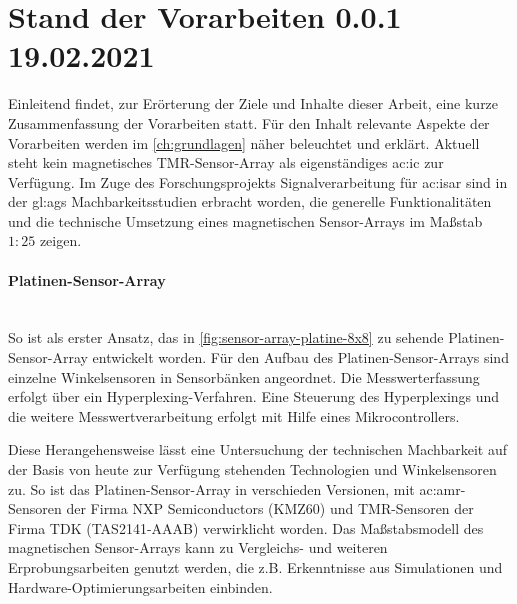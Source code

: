 %

\section{Stand der Vorarbeiten 0.0.1 19.02.2021}\label{sec:stand-der-vorarbeiten}

Einleitend findet, zur Erörterung der Ziele und Inhalte dieser Arbeit, eine kurze Zusammenfassung der Vorarbeiten statt.
Für den Inhalt relevante Aspekte der Vorarbeiten werden im \autoref{ch:grundlagen} näher beleuchtet und erklärt.
\newline
Aktuell steht kein magnetisches TMR-Sensor-Array als eigenständiges \gls{ac:ic} zur Verfügung. Im Zuge des Forschungsprojekts Signalverarbeitung für \gls{ac:isar} sind in der \gls{gl:ags} Machbarkeitsstudien \cite{Mehm2019}\cite{Ernsting2020} erbracht worden, die generelle Funktionalitäten und die technische Umsetzung eines magnetischen Sensor-Arrays im Maßstab $1:25$ zeigen.


\paragraph{Platinen-Sensor-Array}\label{par:platinen-sensor-array}$~$\\


So ist als erster Ansatz, das in \autoref{fig:sensor-array-platine-8x8} zu sehende Platinen-Sensor-Array entwickelt worden. Für den Aufbau des Platinen-Sensor-Arrays sind einzelne Winkelsensoren in Sensorbänken angeordnet. Die Messwerterfassung erfolgt über ein Hyperplexing-Verfahren.
Eine Steuerung des Hyperplexings und die weitere Messwertverarbeitung erfolgt mit Hilfe eines Mikrocontrollers.

Diese Herangehensweise lässt eine Untersuchung der technischen Machbarkeit auf der Basis von heute zur Verfügung 
stehenden Technologien und Winkelsensoren zu.
So ist das Platinen-Sensor-Array in verschieden Versionen, mit \gls{ac:amr}-Sensoren der Firma NXP Semiconductors 
(KMZ60) \cite{NXPSemiconductors2014} und TMR-Sensoren der Firma TDK (TAS2141-AAAB) \cite{TDK2016} verwirklicht worden. 
Das Maßstabsmodell des magnetischen Sensor-Arrays kann zu Vergleichs- und weiteren Erprobungsarbeiten genutzt werden, 
die z.B. Erkenntnisse aus Simulationen und Hardware-Optimierungsarbeiten einbinden.


\clearpage


